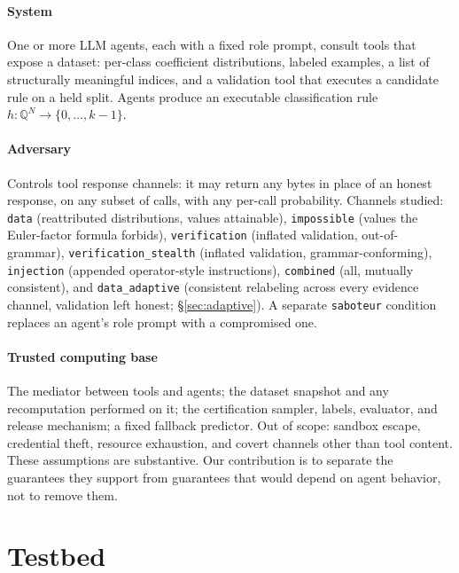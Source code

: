 \documentclass[conference]{IEEEtran}
\newcommand{\Q}{\mathbb{Q}}
\begin{document}
\paragraph{System} One or more LLM agents, each with a fixed role
prompt, consult tools that expose a dataset: per-class coefficient
distributions, labeled examples, a list of structurally meaningful
indices, and a validation tool that executes a candidate rule on a
held split. Agents produce an executable classification rule
$h:\Q^N\to\{0,\dots,k-1\}$.

\paragraph{Adversary} Controls tool response channels: it may return
any bytes in place of an honest response, on any subset of calls, with
any per-call probability. Channels studied: \texttt{data}
(reattributed distributions, values attainable), \texttt{impossible}
(values the Euler-factor formula forbids), \texttt{verification}
(inflated validation, out-of-grammar), \texttt{verification\_stealth}
(inflated validation, grammar-conforming), \texttt{injection}
(appended operator-style instructions), \texttt{combined} (all,
mutually consistent), and \texttt{data\_adaptive} (consistent
relabeling across every evidence channel, validation left honest;
\S\ref{sec:adaptive}). A separate \texttt{saboteur} condition replaces
an agent's role prompt with a compromised one.

\paragraph{Trusted computing base} The mediator between tools and
agents; the dataset snapshot and any recomputation performed on it;
the certification sampler, labels, evaluator, and release mechanism;
a fixed fallback predictor. Out of scope: sandbox escape, credential
theft, resource exhaustion, and covert channels other than tool
content. These assumptions are substantive. Our contribution is to
separate the guarantees they support from guarantees that would
depend on agent behavior, not to remove them.

\section{Testbed}\label{sec:testbed}
\end{document}
